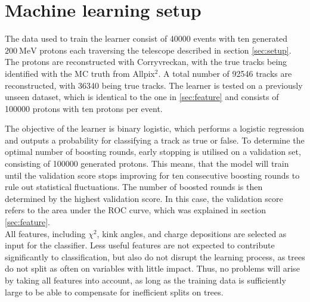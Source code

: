\section{Machine learning setup}
The data used to train the learner %
consist of 40000 events with ten generated $\SI{200}{\mega\eV}$ protons each
traversing the telescope described in section \ref{sec:setup}. The protons
are reconstructed with Corryvreckan, with the true tracks being identified with the MC truth from Allpix$^2$. A total number of 92546 tracks
are reconstructed, with 36340 being true tracks.
The learner is tested on a previously unseen dataset, which is identical to the one in \ref{sec:feature} and consists of 100000 protons with ten protons per event.

The objective of the learner is binary logistic, which performs a logistic regression and outputs a probability for classifying a track as true or false.
To determine the optimal number of boosting rounds, early stopping is utilised on a validation set, consisting of 100000 generated protons. This means, that
the model will train until the validation score stops improving for ten consecutive boosting rounds to rule out statistical fluctuations.
The number of boosted rounds is then determined by the highest validation score.
In this case, the validation score refers to the area under the ROC curve, which was explained in section \ref{sec:feature}. \\
All features, including $\chi^2$, kink angles, and charge depositions are selected as input for the classifier. Less useful features
are not expected to contribute significantly to classification, but also do not disrupt the learning process, as trees do not split as often on variables with little impact.
Thus, no problems will arise by taking all features into account, as long as the training data is sufficiently large to be able to compensate for inefficient splits on trees.


